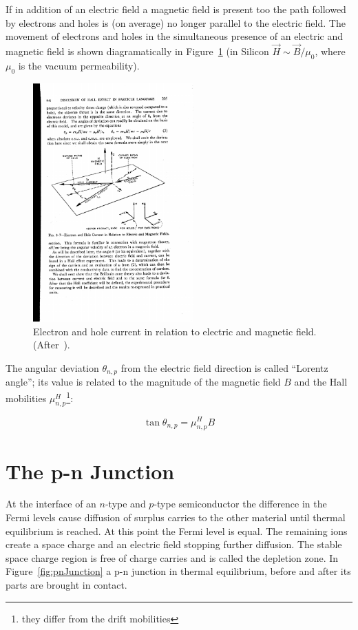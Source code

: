 If in addition of an electric field a magnetic field is present too 
the path followed by electrons and holes is (on average) no longer parallel 
to the electric field. The movement of electrons and holes in the simultaneous presence of an electric and magnetic field is shown diagramatically in Figure~\ref{fig:LorentzAngle} 
(in Silicon $\vec H\sim\vec B/\mu_0$, where $\mu_0$ is the vacuum permeability).
\begin{figure}[htbp]
   \centering
   \includegraphics[width=0.55\textwidth]{LorentzAngle.pdf} 
   \caption{\label{fig:LorentzAngle}Electron and hole current in relation to electric and magnetic field. 
   (After~\cite{Shockley}).}
\end{figure}
The angular deviation $\theta_{n,p}$ from the electric field direction is called ``Lorentz angle''; its value 
is related to the 
magnitude of the magnetic field $B$ and the Hall mobilities $\mu_{n,p}^H$\footnote{they differ from 
the drift mobilities}:

\begin{equation}
\tan{\theta_{n,p}}=\mu_{n,p}^HB
\label{eq:LorentzAngle}
\end{equation}

\section{The p-n Junction}
\label{sec:pnjunction}

At the interface of an $n$-type and $p$-type semiconductor the difference in the Fermi levels cause 
diffusion 
of surplus carries to the other material until thermal equilibrium is reached. At this point the Fermi 
level 
is equal. The remaining ions create a 
space charge and an electric field stopping further diffusion. 
The stable space charge region is free of charge carries and is called the depletion zone. 
In Figure~\ref{fig:pnJunction} a p-n junction in thermal equilibrium, before and after its parts are 
brought in contact.




